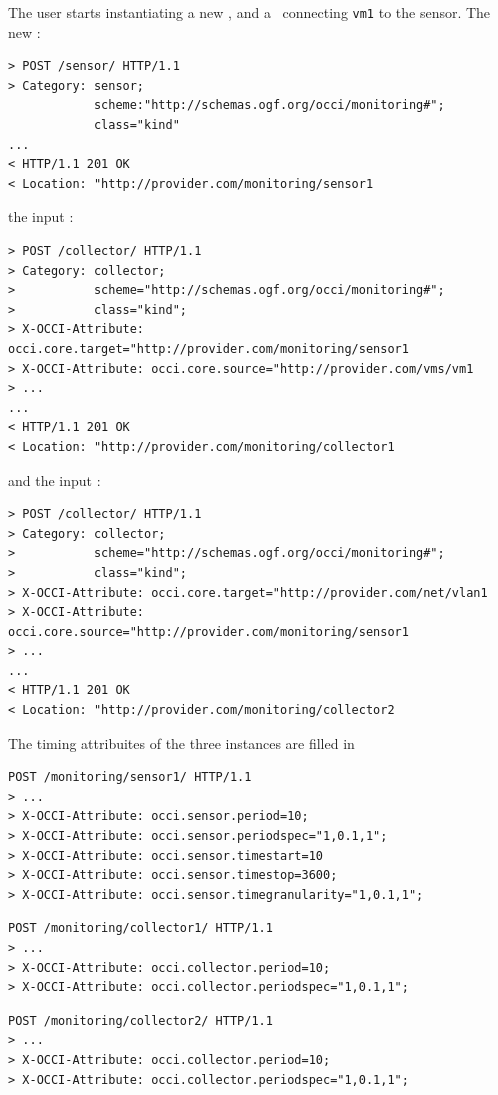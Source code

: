 \documentclass[12pt]{article}  %
\begin{document}
{The user starts instantiating a new \sens, and a \coll\ connecting {\tt vm1} to the sensor. The new \sens:

\begin{verbatim}
> POST /sensor/ HTTP/1.1
> Category: sensor; 
            scheme:"http://schemas.ogf.org/occi/monitoring#"; 
            class="kind"
...
< HTTP/1.1 201 OK
< Location: "http://provider.com/monitoring/sensor1
\end{verbatim}

the input \coll:

\begin{verbatim}
> POST /collector/ HTTP/1.1
> Category: collector;
>           scheme="http://schemas.ogf.org/occi/monitoring#";
>           class="kind";
> X-OCCI-Attribute: occi.core.target="http://provider.com/monitoring/sensor1
> X-OCCI-Attribute: occi.core.source="http://provider.com/vms/vm1
> ...
...
< HTTP/1.1 201 OK
< Location: "http://provider.com/monitoring/collector1
\end{verbatim}

and the input \coll:

\begin{verbatim}
> POST /collector/ HTTP/1.1
> Category: collector;
>           scheme="http://schemas.ogf.org/occi/monitoring#";
>           class="kind";
> X-OCCI-Attribute: occi.core.target="http://provider.com/net/vlan1
> X-OCCI-Attribute: occi.core.source="http://provider.com/monitoring/sensor1
> ...
...
< HTTP/1.1 201 OK
< Location: "http://provider.com/monitoring/collector2
\end{verbatim}
The timing attribuites of the three instances are filled in

\begin{verbatim}
POST /monitoring/sensor1/ HTTP/1.1
> ...
> X-OCCI-Attribute: occi.sensor.period=10;
> X-OCCI-Attribute: occi.sensor.periodspec="1,0.1,1";
> X-OCCI-Attribute: occi.sensor.timestart=10
> X-OCCI-Attribute: occi.sensor.timestop=3600;
> X-OCCI-Attribute: occi.sensor.timegranularity="1,0.1,1";
\end{verbatim}

\begin{verbatim}
POST /monitoring/collector1/ HTTP/1.1
> ...
> X-OCCI-Attribute: occi.collector.period=10;
> X-OCCI-Attribute: occi.collector.periodspec="1,0.1,1";
\end{verbatim}

\begin{verbatim}
POST /monitoring/collector2/ HTTP/1.1
> ...
> X-OCCI-Attribute: occi.collector.period=10;
> X-OCCI-Attribute: occi.collector.periodspec="1,0.1,1";
\end{verbatim}

}
\end{document}
